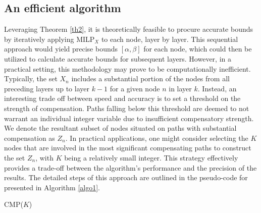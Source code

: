 \subsection{An efficient algorithm}


Leveraging Theorem \ref{th2}, it is theoretically feasible to procure accurate bounds by iteratively applying MILP$_{X}$ to each node, layer by layer. This sequential approach would yield precise bounds $[\alpha,\beta]$ for each node, which could then be utilized to calculate accurate bounds for subsequent layers. However, in a practical setting, this methodology may prove to be computationally inefficient. Typically, the set $X_n$ includes a substantial portion of the nodes from all preceding layers up to layer $k-1$ for a given node $n$ in layer $k$. Instead, an interesting trade off between speed and accuracy is to set a threshold on the strength of compensation. Paths falling below this threshold are deemed to not warrant an individual integer variable due to insufficient compensatory strength. We denote the resultant subset of nodes situated on paths with substantial compensation as $Z_n$. In practical applications, one might consider selecting the $K$ nodes that are involved in the most significant compensating paths to construct the set $Z_n$, with $K$ being a relatively small integer. This strategy effectively provides a trade-off between the algorithm's performance and the precision of the results. The detailed steps of this approach are outlined in the pseudo-code for \CMP presented in Algorithm \ref{algo1}.






\begin{algorithm}[b!]
	\caption{CMP($K$)}
	\label{algo1}
	
	
\end{algorithm}	




